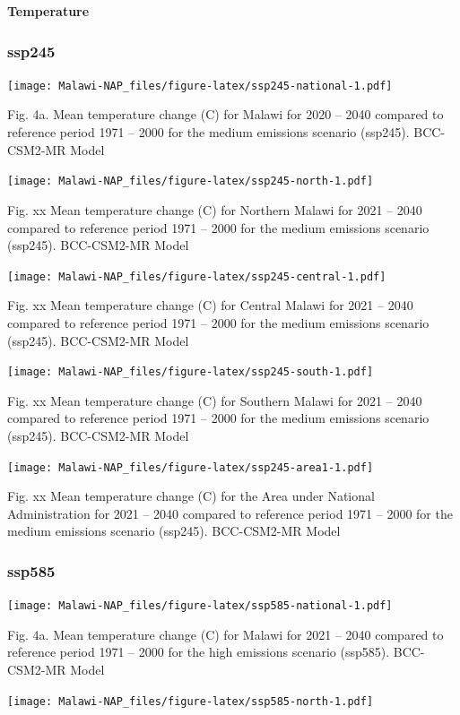 \documentclass[
]{book}
\begin{document}
\textbf{Temperature}

\hypertarget{ssp245}{%
\subsubsection{ssp245}\label{ssp245}}

\texttt{[image: Malawi-NAP\_files/figure-latex/ssp245-national-1.pdf]}

Fig. 4a. Mean temperature change (C) for Malawi for 2020 -- 2040 compared to reference period 1971 -- 2000 for the medium emissions scenario (ssp245). BCC-CSM2-MR Model

\texttt{[image: Malawi-NAP\_files/figure-latex/ssp245-north-1.pdf]}

Fig. xx Mean temperature change (C) for Northern Malawi for 2021 -- 2040 compared to reference period 1971 -- 2000 for the medium emissions scenario (ssp245). BCC-CSM2-MR Model

\texttt{[image: Malawi-NAP\_files/figure-latex/ssp245-central-1.pdf]}

Fig. xx Mean temperature change (C) for Central Malawi for 2021 -- 2040 compared to reference period 1971 -- 2000 for the medium emissions scenario (ssp245). BCC-CSM2-MR Model

\texttt{[image: Malawi-NAP\_files/figure-latex/ssp245-south-1.pdf]}

Fig. xx Mean temperature change (C) for Southern Malawi for 2021 -- 2040 compared to reference period 1971 -- 2000 for the medium emissions scenario (ssp245). BCC-CSM2-MR Model

\texttt{[image: Malawi-NAP\_files/figure-latex/ssp245-area1-1.pdf]}

Fig. xx Mean temperature change (C) for the Area under National Administration for 2021 -- 2040 compared to reference period 1971 -- 2000 for the medium emissions scenario (ssp245). BCC-CSM2-MR Model

\hypertarget{ssp585}{%
\subsubsection{ssp585}\label{ssp585}}

\texttt{[image: Malawi-NAP\_files/figure-latex/ssp585-national-1.pdf]}

Fig. 4a. Mean temperature change (C) for Malawi for 2021 -- 2040 compared to reference period 1971 -- 2000 for the high emissions scenario (ssp585). BCC-CSM2-MR Model

\texttt{[image: Malawi-NAP\_files/figure-latex/ssp585-north-1.pdf]}
\end{document}
